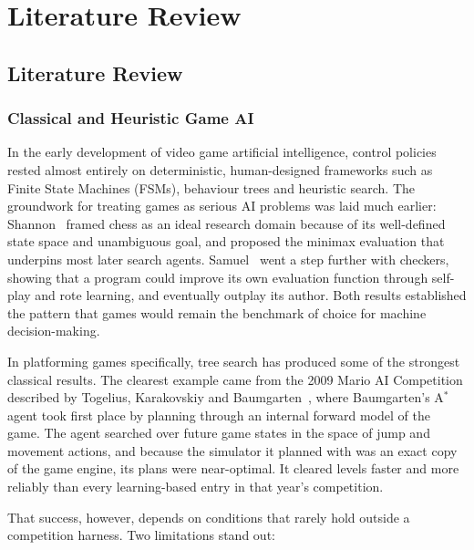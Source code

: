 \chapter{Literature Review}
\label{ch:literature-review}

\section{Literature Review}
\label{sec:literature-review}

\subsection{Classical and Heuristic Game AI}
\label{subsec:lit-1}

In the early development of video game artificial intelligence, control policies
rested almost entirely on deterministic, human-designed frameworks such as
Finite State Machines (FSMs), behaviour trees and heuristic search. The
groundwork for treating games as serious AI problems was laid much earlier:
Shannon~\cite{shannon1950} framed chess as an ideal research domain because of its
well-defined state space and unambiguous goal, and proposed the minimax
evaluation that underpins most later search agents. Samuel~\cite{samuel1959} went a step
further with checkers, showing that a program could improve its own evaluation
function through self-play and rote learning, and eventually outplay its author.
Both results established the pattern that games would remain the benchmark of
choice for machine decision-making.

\noindent
In platforming games specifically, tree search has produced some of the
strongest classical results. The clearest example came from the 2009 Mario AI
Competition described by Togelius, Karakovskiy and Baumgarten~\cite{togelius2010}, where
Baumgarten's A$^*$ agent took first place by planning through an internal
forward model of the game. The agent searched over future game states in the
space of jump and movement actions, and because the simulator it planned with
was an exact copy of the game engine, its plans were near-optimal. It cleared
levels faster and more reliably than every learning-based entry in that year's
competition.

\noindent
That success, however, depends on conditions that rarely hold outside a
competition harness. Two limitations stand out:

